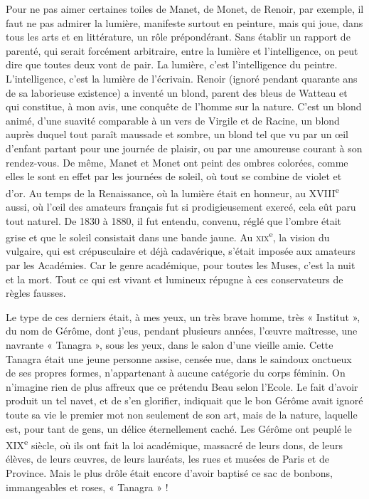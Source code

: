 \documentclass[french,twoside]{book} %
\begin{document}
Pour ne pas aimer certaines toiles de Manet, de Monet, de Renoir, par exemple, il faut ne pas admirer la lumière, manifeste surtout en peinture, mais qui joue, dans tous les arts et en littérature, un rôle prépondérant. Sans établir un rapport de parenté, qui serait forcément arbitraire, entre la lumière et l’intelligence, on peut dire que toutes deux vont de pair. La lumière, c’est l’intelligence du peintre. L’intelligence, c’est la lumière de l’écrivain. Renoir (ignoré pendant quarante ans de sa laborieuse existence) a inventé un blond, parent des bleus de Watteau et qui constitue, à mon avis, une conquête de l’homme sur la nature. C’est un blond animé, d’une suavité comparable à un vers de Virgile et de Racine, un blond auprès duquel tout paraît maussade et sombre, un blond tel que vu par un œil d’enfant partant pour une journée de plaisir, ou par une amoureuse courant à son rendez-vous. De même, Manet et Monet ont peint des ombres colorées, comme elles le sont en effet par les journées de soleil, où tout se combine de violet et d’or. Au temps de la Renaissance, où la lumière était en honneur, au XVIII\textsuperscript{e} aussi, où l’œil des amateurs français fut si prodigieusement exercé, cela eût paru tout naturel. De 1830 à 1880, il fut entendu, convenu, réglé que l’ombre était grise et que le soleil consistait dans une bande jaune. Au \textsc{xix}\textsuperscript{e}, la vision du vulgaire, qui est crépusculaire et déjà cadavérique, s’était imposée aux amateurs par les Académies. Car le genre académique, pour toutes les Muses, c’est la nuit et la mort. Tout ce qui est vivant et lumineux répugne à ces conservateurs de règles fausses.\par
Le type de ces derniers était, à mes yeux, un très brave homme, très « Institut », du nom de Gérôme, dont j’eus, pendant plusieurs années, l’œuvre maîtresse, une navrante « Tanagra », sous les yeux, dans le salon d’une vieille amie. Cette Tanagra était une jeune personne assise, censée nue, dans le saindoux onctueux de ses propres formes, n’appartenant à aucune catégorie du corps féminin. On n’imagine rien de plus affreux que ce prétendu Beau selon l’Ecole. Le fait d’avoir produit un tel navet, et de s’en glorifier, indiquait que le bon Gérôme avait ignoré toute sa vie le premier mot non seulement de son art, mais de la nature, laquelle est, pour tant de gens, un délice éternellement caché. Les Gérôme ont peuplé le XIX\textsuperscript{e} siècle, où ils ont fait la loi académique, massacré de leurs dons, de leurs élèves, de leurs œuvres, de leurs lauréats, les rues et musées de Paris et de Province. Mais le plus drôle était encore d’avoir baptisé ce sac de bonbons, immangeables et roses, « Tanagra » !\par
\end{document}
